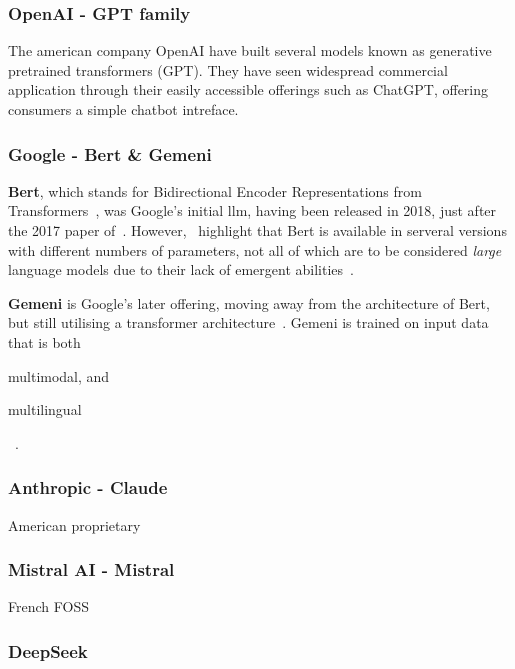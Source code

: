 \subsubsection{OpenAI - GPT family}

The american company OpenAI have built several models known as generative pretrained transformers
(GPT). They have seen widespread  commercial application through their easily accessible offerings
such as ChatGPT, offering consumers a simple chatbot intreface.

\subsubsection{Google - Bert \& Gemeni}

\textbf{Bert}, which stands for Bidirectional Encoder Representations from
Transformers~\cite{bertPaper}, was Google's initial \acrshort{llm}, having been released in 2018,
just after the 2017 paper of~\citeauthor{attentionIsAllYouNeed}. However,~\citeauthor{llmSurvey}
highlight that Bert is available in serveral versions with different numbers of parameters, not all
of which are to be considered \textit{large} language models due to their lack of emergent
abilities~\cite[1, 3, 86]{llmSurvey}.

\textbf{Gemeni} is Google's later offering, moving away from the architecture of Bert, but still
utilising a transformer architecture~\cite[3]{gemeniReport}. Gemeni is trained on input data that is
both \begin{inparaenum}
    \item multimodal, and
    \item multilingual
\end{inparaenum}~\cite[5]{gemeniReport}.


\subsubsection{Anthropic - Claude}

American proprietary

\subsubsection{Mistral AI - Mistral}

French FOSS

\subsubsection{DeepSeek}

